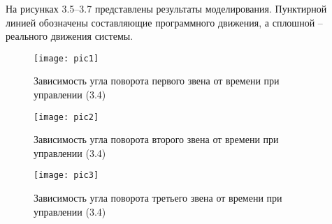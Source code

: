  На рисунках 3.5–3.7 представлены результаты моделирования. Пунктирной линией обозначены  составляющие программного движения, а сплошной – реального движения системы.
 
 
  \begin{figure}[h]
  	\centering
  	\texttt{[image: pic1]}
  	\caption{Зависимость угла поворота первого звена от времени при управлении (3.4) }
  	\label{fig:manip2}
  \end{figure}
  
  \begin{figure}[h]
    	\centering
    	\texttt{[image: pic2]}
    	\caption{Зависимость угла поворота второго звена от времени при управлении (3.4)  }
    	\label{fig:manip2}
    \end{figure}
    
      \begin{figure}[h]
      	\centering
      	\texttt{[image: pic3]}
      	\caption{Зависимость угла поворота третьего звена от времени при управлении (3.4) }
      	\label{fig:manip2}
      \end{figure}